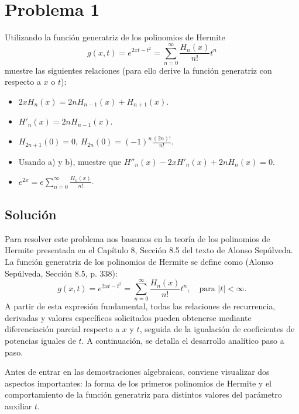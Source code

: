 \documentclass[a4paper]{article}
\begin{document}
\section{Problema 1}
Utilizando la función generatriz de los polinomios de Hermite
$$
g(x, t) = e^{2xt - t^2} = \sum_{n=0}^{\infty} \frac{H_n(x)}{n!} t^n
$$
muestre las siguientes relaciones (para ello derive la función generatriz con respecto a $x$ o $t$):
\begin{itemize}
    \item[a)] $2xH_n(x) = 2nH_{n-1}(x) + H_{n+1}(x)$.
    \item[b)] $H'_n(x) = 2nH_{n-1}(x)$.
    \item[c)] $H_{2n+1}(0) = 0$, $H_{2n}(0) = (-1)^n \frac{(2n)!}{n!}$.
    \item[d)] Usando a) y b), muestre que $H''_n(x) - 2xH'_n(x) + 2nH_n(x) = 0$.
    \item[e)] $e^{2x} = e \sum_{n=0}^{\infty} \frac{H_n(x)}{n!}$.
\end{itemize}

\subsection{Solución}
Para resolver este problema nos basamos en la teoría de los polinomios de Hermite presentada en el Capítulo 8, Sección 8.5 del texto de Alonso Sepúlveda. La función generatriz de los polinomios de Hermite se define como (Alonso Sepúlveda, Sección 8.5, p. 338):
$$
g(x, t) = e^{2xt - t^2} = \sum_{n=0}^{\infty} \frac{H_n(x)}{n!} t^n, \quad \text{para } |t| < \infty.
$$
A partir de esta expresión fundamental, todas las relaciones de recurrencia, derivadas y valores específicos solicitados pueden obtenerse mediante diferenciación parcial respecto a $x$ y $t$, seguida de la igualación de coeficientes de potencias iguales de $t$. A continuación, se detalla el desarrollo analítico paso a paso.

Antes de entrar en las demostraciones algebraicas, conviene visualizar dos aspectos importantes: la forma de los primeros polinomios de Hermite y el comportamiento de la función generatriz para distintos valores del parámetro auxiliar $t$.
\end{document}
